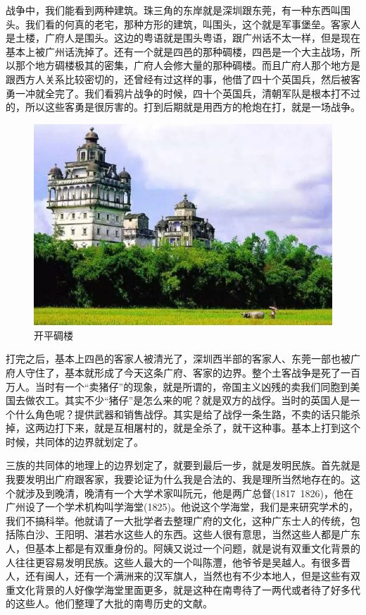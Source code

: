 战争中，我们能看到两种建筑。珠三角的东岸就是深圳跟东莞，有一种东西叫围头。我们看的何真的老宅，那种方形的建筑，叫围头，这个就是军事堡垒。客家人是土楼，广府人是围头。这边的粤语就是围头粤语，跟广州话不太一样，但是现在基本上被广州话洗掉了。还有一个就是四邑的那种碉楼，四邑是一个大主战场，所以那个地方碉楼极其的密集，广府人会修大量的那种碉楼。而且广府人那个地方是跟西方人关系比较密切的，还曾经有过这样的事，他借了四十个英国兵，然后被客勇一冲就全完了。我们看鸦片战争的时候，四十个英国兵，清朝军队是根本打不过的，所以这些客勇是很厉害的。打到后期就是用西方的枪炮在打，就是一场战争。

\begin{figure}
	\centering
	\includegraphics[width=\textwidth]{images/image-73}
	\caption{开平碉楼}
\end{figure}

打完之后，基本上四邑的客家人被清光了，深圳西半部的客家人、东莞一部也被广府人守住了，基本就形成了今天这条广府、客家的边界。整个土客战争是死了一百万人。当时有一个“卖猪仔”的现象，就是所谓的，帝国主义凶残的卖我们同胞到美国去做农工。其实不少“猪仔”是怎么来的呢？就是双方的战俘。当时的英国人是一个什么角色呢？提供武器和销售战俘。其实是给了战俘一条生路，不卖的话只能杀掉，这两边打下来，就是互相屠村的，就是全杀了，就干这种事。基本上打到这个时候，共同体的边界就划定了。

三族的共同体的地理上的边界划定了，就要到最后一步，就是发明民族。首先就是我要发明出广府跟客家，我要论证为什么我是合法的、我是理所当然地存在的。这个就涉及到晚清，晚清有一个大学术家叫阮元，他是两广总督(1817~1826)，他在广州设了一个学术机构叫学海堂(1825)。他说这个学海堂，我们是来研究学术的，我们不搞科举。他就请了一大批学者去整理广府的文化，这种广东士人的传统，包括陈白沙、王阳明、湛若水这些人的东西。这些人很有意思，当然这些人都是广东人，但基本上都是有双重身份的。阿姨又说过一个问题，就是说有双重文化背景的人往往更容易发明民族。这些人最大的一个叫陈灃，他爷爷是吴越人。有很多晋人，还有闽人，还有一个满洲来的汉军旗人，当然也有不少本地人，但是这些有双重文化背景的人好像学海堂里面更多，就是这种在南粤待了一两代或者待了好多代的这些人。他们整理了大批的南粤历史的文献。

